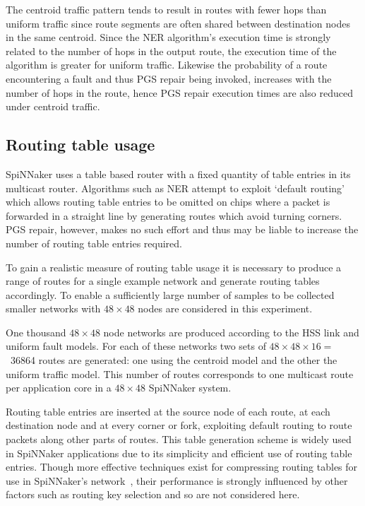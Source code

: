 			The centroid traffic pattern tends to result in routes with fewer hops
			than uniform traffic since route segments are often shared between
			destination nodes in the same centroid.  Since the NER algorithm's
			execution time is strongly related to the number of hops in the output
			route, the execution time of the algorithm is greater for uniform
			traffic.  Likewise the probability of a route encountering a fault and
			thus PGS repair being invoked, increases with the number of hops in the
			route, hence PGS repair execution times are also reduced under centroid
			traffic.
		
		\subsection{Routing table usage}
			
			SpiNNaker uses a table based router with a fixed quantity of table
			entries in its multicast router. Algorithms such as NER attempt to
			exploit `default routing' which allows routing table entries to be
			omitted on chips where a packet is forwarded in a straight line by
			generating routes which avoid turning corners.  PGS repair, however,
			makes no such effort and thus may be liable to increase the number of
			routing table entries required.
			
			To gain a realistic measure of routing table usage it is necessary to
			produce a range of routes for a single example network and generate
			routing tables accordingly.  To enable a sufficiently large number of
			samples to be collected smaller networks with $48\times48$ nodes are
			considered in this experiment.
			
			One thousand $48\times48$ node networks are produced according to the HSS
			link and uniform fault models. For each of these networks two sets of
			$48\times48\times16=$~\num{36864} routes are generated: one using the
			centroid model and the other the uniform traffic model. This number of
			routes corresponds to one multicast route per application core in a
			$48\times48$ SpiNNaker system.
			
			Routing table entries are inserted at the source node of each route, at
			each destination node and at every corner or fork, exploiting default
			routing to route packets along other parts of routes. This table
			generation scheme is widely used in SpiNNaker applications due to its
			simplicity and efficient use of routing table entries. Though more
			effective techniques exist for compressing routing tables for use in
			SpiNNaker's network~\cite{mundy16}, their performance is strongly
			influenced by other factors such as routing key selection and so are not
			considered here.
			
